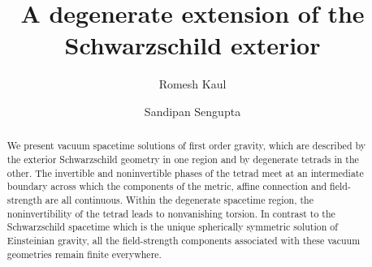 \documentclass[preprint,aps,superscriptaddress,nofootinbib]{revtex4-1}
\begin{document}
\title{A degenerate extension of the Schwarzschild exterior}

\author{Romesh Kaul}

\author{Sandipan Sengupta}

\begin{abstract}

We present vacuum spacetime solutions of first order gravity, which are described by the exterior Schwarzschild geometry in one region and by degenerate tetrads in the other. The invertible and noninvertible phases of the tetrad meet at an intermediate boundary across which the components of the metric, affine connection and field-strength are all continuous. Within the degenerate spacetime region, the noninvertibility of the tetrad leads to nonvanishing torsion. In contrast to the Schwarzschild
spacetime which is the unique spherically symmetric solution of Einsteinian gravity, all the field-strength components associated with these vacuum geometries remain finite everywhere.

%

 
\end{abstract}
  
\maketitle
\end{document}
